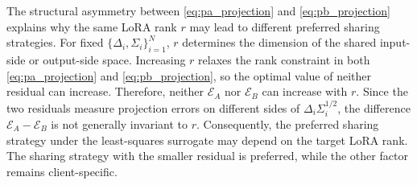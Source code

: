 \documentclass[lettersize,journal]{IEEEtran}
\begin{document}
	The structural asymmetry between \eqref{eq:pa_projection} and \eqref{eq:pb_projection}
	explains why the same LoRA rank $r$ may lead to different preferred sharing strategies. 
	For fixed $\{\Delta_i,\Sigma_i\}_{i=1}^{N}$, $r$ determines the dimension of the shared input-side or output-side space. Increasing $r$ relaxes the rank constraint in both \eqref{eq:pa_projection} and \eqref{eq:pb_projection}, so the optimal value of neither residual can increase. Therefore, neither $\mathcal{E}_A$ nor $\mathcal{E}_B$ can increase with $r$. 
	Since the two residuals measure projection errors on different sides of $\Delta_i\Sigma_i^{1/2}$, the difference $\mathcal{E}_A-\mathcal{E}_B$ is not generally invariant to $r$. Consequently, the preferred sharing strategy under the least-squares surrogate may depend on the target LoRA rank. The sharing strategy with the smaller residual is preferred, while the other factor remains client-specific.
\end{document}
